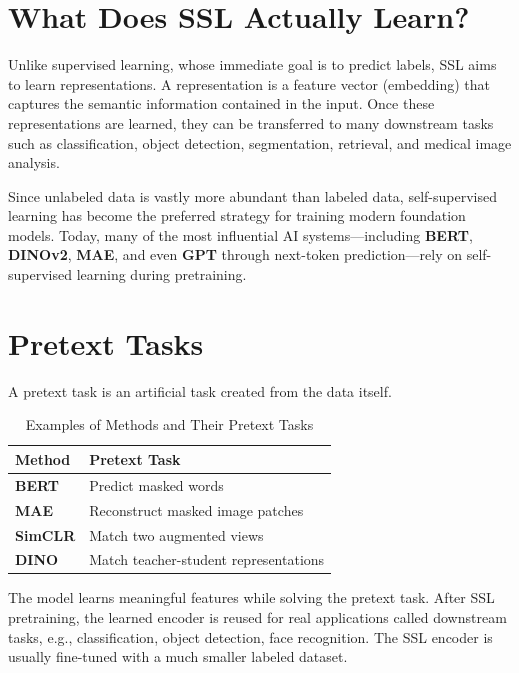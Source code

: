 \section{What Does SSL Actually Learn?}

Unlike supervised learning, whose immediate goal is to predict labels, SSL aims to learn representations. A representation is a feature vector (embedding) that captures the semantic information contained in the input. Once these representations are learned, they can be transferred to many downstream tasks such as classification, object detection, segmentation, retrieval, and medical image analysis.

Since unlabeled data is vastly more abundant than labeled data, self-supervised learning has become the preferred strategy for training modern foundation models. Today, many of the most influential AI systems---including \textbf{BERT}, \textbf{DINOv2}, \textbf{MAE}, and even \textbf{GPT} through next-token prediction---rely on self-supervised learning during pretraining.

\section{Pretext Tasks}

A pretext task is an artificial task created from the data itself.

\begin{table}[H]
\centering
\caption{Examples of Methods and Their Pretext Tasks}
\label{tab:pretext_tasks}
\begin{tabularx}{\textwidth}{lX}
\toprule
\textbf{Method} & \textbf{Pretext Task} \\
\midrule
\textbf{BERT} & Predict masked words \\
\textbf{MAE} & Reconstruct masked image patches \\
\textbf{SimCLR} & Match two augmented views \\
\textbf{DINO} & Match teacher-student representations \\
\bottomrule
\end{tabularx}
\end{table}

The model learns meaningful features while solving the pretext task. After SSL pretraining, the learned encoder is reused for real applications called downstream tasks, e.g., classification, object detection, face recognition. The SSL encoder is usually fine-tuned with a much smaller labeled dataset.

